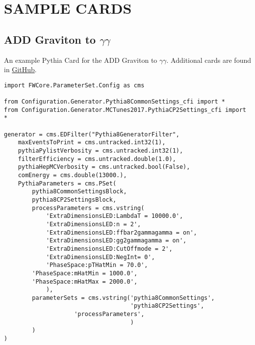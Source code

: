 \chapter{SAMPLE CARDS}
\RaggedRight \parindent=25pt
\label{ch:appendix_sample_cards}
\section{ADD Graviton to $\gamma\gamma$}
An example Pythia Card for the ADD Graviton to $\gamma\gamma$. 
Additional cards are found in \href{https://github.com/uzzielperez/Analyses/tree/master/Analysis_v1/Simulation/Pythia}{GitHub}.

\begin{singlespace}
\begin{small}
\begin{verbatim}
import FWCore.ParameterSet.Config as cms 

from Configuration.Generator.Pythia8CommonSettings_cfi import *
from Configuration.Generator.MCTunes2017.PythiaCP2Settings_cfi import *

generator = cms.EDFilter("Pythia8GeneratorFilter",
    maxEventsToPrint = cms.untracked.int32(1),
    pythiaPylistVerbosity = cms.untracked.int32(1),
    filterEfficiency = cms.untracked.double(1.0),
    pythiaHepMCVerbosity = cms.untracked.bool(False),
    comEnergy = cms.double(13000.),
    PythiaParameters = cms.PSet(
        pythia8CommonSettingsBlock,
        pythia8CP2SettingsBlock,
        processParameters = cms.vstring(
            'ExtraDimensionsLED:LambdaT = 10000.0',
            'ExtraDimensionsLED:n = 2',
            'ExtraDimensionsLED:ffbar2gammagamma = on',
            'ExtraDimensionsLED:gg2gammagamma = on',
            'ExtraDimensionsLED:CutOffmode = 2', 
            'ExtraDimensionsLED:NegInt= 0',
            'PhaseSpace:pTHatMin = 70.0',
	    'PhaseSpace:mHatMin = 1000.0',	    
	    'PhaseSpace:mHatMax = 2000.0', 
            ),  
        parameterSets = cms.vstring('pythia8CommonSettings',
                                    'pythia8CP2Settings', 
				    'processParameters',
                                    )   
        )   
)
\end{verbatim}
\end{small}
\end{singlespace}


